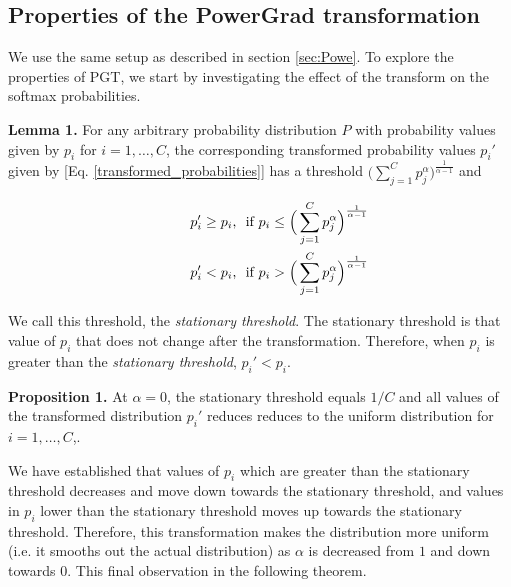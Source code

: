 \documentclass[runningheads]{llncs}
\begin{document}
\subsection{Properties of the PowerGrad transformation}
\label{sec:pgt_prop}

We use the same setup as described in section \ref{sec:Powe}. To explore the properties
of PGT, we start by investigating the effect of the transform on the softmax
probabilities.

\textbf{Lemma 1.} For any arbitrary probability distribution $P$ with probability values
given by $p_i$ for $i=1,\dots,C$, the corresponding transformed probability values
$p_i'$ given by [Eq. \ref{transformed_probabilities}] has a threshold $\Big(\sum
_{j=1}^C p_j^{\alpha}\Big)^{\frac{1}{\alpha-1}}$ and

\vspace{-0.5cm}
\begin{equation} \begin{split} p_i' \geq p_i & \text{,\ \ if } p_i \leq
\Big(\sum _{j=1}^C p_j^{\alpha }\Big)^{\frac{1}{\alpha-1}} \\ \hspace*{1cm}
p_i' < p_i & \text{,\ \ if } p_i > \Big(\sum _{j=1}^C
p_j^{\alpha}\Big)^{\frac{1}{\alpha-1}} \end{split} \label{eqn:threshold}
\end{equation}

\vspace{-0.2cm}
We call this threshold, the \textit{stationary threshold}. The stationary threshold is
that value of $p_i$ that does not change after the transformation. Therefore, when $p_i$
is greater than the \textit{stationary threshold}, $p_i' < p_i$.



\textbf{Proposition 1.} At $\alpha=0$, the stationary threshold equals $1/C$ and all
values of the transformed distribution $p_i'$ reduces reduces to the uniform
distribution for $i=1,\dots,C$,.

We have established that values of $p_i$ which are greater than the stationary threshold
decreases and move down towards the stationary threshold, and values in $p_i$ lower than
the stationary threshold moves up towards the stationary threshold. Therefore, this
transformation makes the distribution more uniform (i.e. it smooths out the actual
distribution) as $\alpha$ is decreased from $1$ and down towards $0$. This final
observation in the following theorem.
\end{document}
